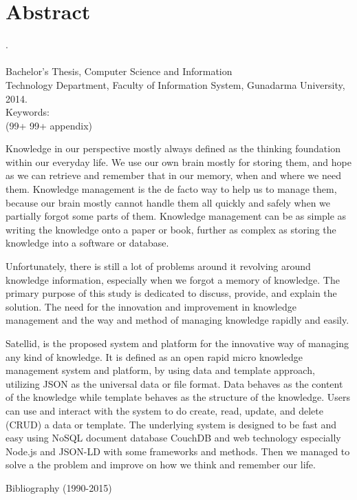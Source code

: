 
\begingroup
\let\clearpage\relax
\let\cleardoublepage\relax

\chapter{Abstract}
\label{chap:abstract}

\myName. \myNPM \\
\myDepTitle \\
Bachelor’s Thesis, Computer Science and Information \\ Technology Department, Faculty of Information System, Gunadarma University, 2014. \\
Keywords: \myKeywords \\
(99+ 99+ appendix)

%
\vfill

Knowledge in our perspective mostly always defined as the thinking foundation within our everyday life.
We use our own brain mostly for storing them, and hope as we can retrieve and remember that in our memory, when and where we need them.
Knowledge management is the de facto way to help us to manage them, because our brain mostly cannot handle them all quickly and safely when we partially forgot some parts of them.
Knowledge management can be as simple as writing the knowledge onto a paper or book, further as complex as storing the knowledge into a software or database.

Unfortunately, there is still a lot of problems around it revolving around knowledge information, especially when we forgot a memory of knowledge.
The primary purpose of this study is dedicated to discuss, provide, and explain the solution.
The need for the innovation and improvement in knowledge management and the way and method of managing knowledge rapidly and easily.

Satellid, is the proposed system and platform for the innovative way of managing any kind of knowledge.
It is defined as an open rapid micro knowledge management system and platform, by using data and template approach, utilizing JSON as the universal data or file format.
Data behaves as the content of the knowledge while template behaves as the structure of the knowledge.
Users can use and interact with the system to do create, read, update, and delete (CRUD) a data or template.
The underlying system is designed to be fast and easy using NoSQL document database CouchDB and web technology especially Node.js and JSON-LD with some frameworks and methods.
Then we managed to solve a the problem and improve on how we think and remember our life.

\vfill

Bibliography (1990-2015)




\endgroup

\vfill

